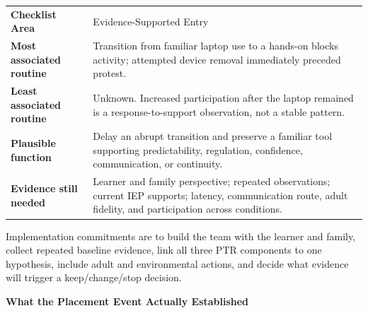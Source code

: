 \small
\renewcommand{\arraystretch}{1.13}
\setlength{\tabcolsep}{5pt}
\begin{tabularx}{\textwidth}{>{\bfseries\RaggedRight\arraybackslash}p{1.36in} >{\RaggedRight\arraybackslash}X}
\rowcolor{PrimaryRed}
\color{white}Checklist Area & \color{white}Evidence-Supported Entry \\
Most associated routine & Transition from familiar laptop use to a hands-on blocks activity; attempted device removal immediately preceded protest. \\
\rowcolor{SoftGray}
Least associated routine & Unknown. Increased participation after the laptop remained is a response-to-support observation, not a stable pattern. \\
Plausible function & Delay an abrupt transition and preserve a familiar tool supporting predictability, regulation, confidence, communication, or continuity. \\
\rowcolor{SoftGray}
Evidence still needed & Learner and family perspective; repeated observations; current IEP supports; latency, communication route, adult fidelity, and participation across conditions. \\
\end{tabularx}
\normalsize

Implementation commitments are to build the team with the learner and family, collect repeated baseline evidence, link all three PTR components to one hypothesis, include adult and environmental actions, and decide what evidence will trigger a keep/change/stop decision.

\begin{center}
{\scriptsize\bfseries\color{DeepNavy}What the Placement Event Actually Established}\par
\vspace{0.035in}
\end{center}

